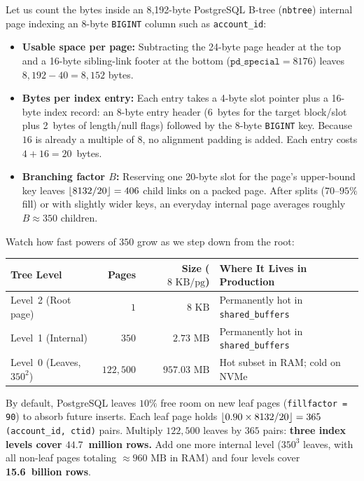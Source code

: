 \begin{example}
\label{ex:ch03-fanout}
Let us count the bytes inside an 8,192-byte PostgreSQL B-tree (\texttt{nbtree}) internal page indexing an 8-byte \texttt{BIGINT} column such as \texttt{account\_id}:
\begin{itemize}
  \item \textbf{Usable space per page:} Subtracting the 24-byte page header at the top and a 16-byte sibling-link footer at the bottom ($\texttt{pd\_special} = 8176$) leaves $8{,}192 - 40 = 8{,}152$ bytes.
  \item \textbf{Bytes per index entry:} Each entry takes a 4-byte slot pointer plus a 16-byte index record: an 8-byte entry header (6~bytes for the target block/slot plus 2~bytes of length/null flags) followed by the 8-byte \texttt{BIGINT} key. Because $16$ is already a multiple of 8, no alignment padding is added. Each entry costs $4 + 16 = 20$~bytes.
  \item \textbf{Branching factor $B$:} Reserving one 20-byte slot for the page's upper-bound key leaves $\lfloor8132 / 20\rfloor = 406$ child links on a packed page. After splits ($70\text{--}95\%$ fill) or with slightly wider keys, an everyday internal page averages roughly $B \approx 350$ children.
\end{itemize}
Watch how fast powers of $350$ grow as we step down from the root:
\begin{center}
\small
\begin{tabular}{@{}lrrl@{}}
\toprule
\textbf{Tree Level} & \textbf{Pages} & \textbf{Size ($8\text{ KB/pg}$)} & \textbf{Where It Lives in Production} \\
\midrule
Level~2 (Root page) & $1$ & $8\text{ KB}$ & Permanently hot in \texttt{shared\_buffers} \\
Level~1 (Internal) & $350$ & $2.73\text{ MB}$ & Permanently hot in \texttt{shared\_buffers} \\
Level~0 (Leaves, $350^2$) & $122{,}500$ & $957.03\text{ MB}$ & Hot subset in RAM; cold on NVMe \\
\bottomrule
\end{tabular}
\end{center}
By default, PostgreSQL leaves $10\%$ free room on new leaf pages (\texttt{fillfactor = 90}) to absorb future inserts. Each leaf page holds $\lfloor0.90 \times 8132 / 20\rfloor = 365$ \texttt{(account\_id, ctid)} pairs. Multiply $122{,}500$ leaves by $365$ pairs: \textbf{three index levels cover $44.7$~million rows.} Add one more internal level ($350^3$ leaves, with all non-leaf pages totaling $\approx 960\text{ MB}$ in RAM) and four levels cover \textbf{15.6~billion rows}.
\end{example}

